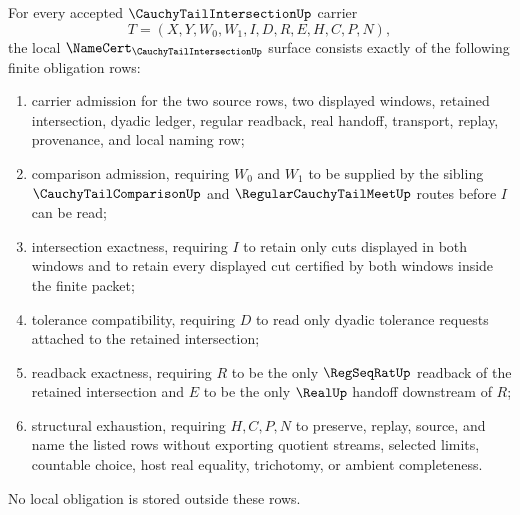 \begin{theorem}
\label{thm:cauchy-tail-intersection-namecert-obligations}
For every accepted $\CauchyTailIntersectionUp$ carrier
$$
T=(X,Y,W_0,W_1,I,D,R,E,H,C,P,N),
$$
the local $\NameCert_{\CauchyTailIntersectionUp}$ surface consists exactly of the following finite obligation rows:
\begin{enumerate}
\item carrier admission for the two source rows, two displayed windows, retained intersection, dyadic ledger, regular readback, real handoff, transport, replay, provenance, and local naming row;
\item comparison admission, requiring $W_0$ and $W_1$ to be supplied by the sibling $\CauchyTailComparisonUp$ and $\RegularCauchyTailMeetUp$ routes before $I$ can be read;
\item intersection exactness, requiring $I$ to retain only cuts displayed in both windows and to retain every displayed cut certified by both windows inside the finite packet;
\item tolerance compatibility, requiring $D$ to read only dyadic tolerance requests attached to the retained intersection;
\item readback exactness, requiring $R$ to be the only $\RegSeqRatUp$ readback of the retained intersection and $E$ to be the only $\RealUp$ handoff downstream of $R$;
\item structural exhaustion, requiring $H,C,P,N$ to preserve, replay, source, and name the listed rows without exporting quotient streams, selected limits, countable choice, host real equality, trichotomy, or ambient completeness.
\end{enumerate}
No local obligation is stored outside these rows.
\end{theorem}
